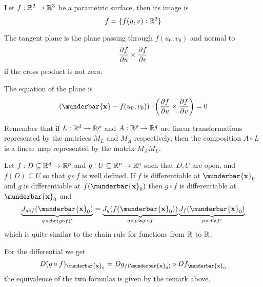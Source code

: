 \documentclass[14pt]{extarticle}
\renewcommand{\vec}[1]{\munderbar{\mathbf{#1}}}
\begin{document}
\begin{example}
    Let $f: \mathbb{R}^2 \to \mathbb{R}^3$ be a parametric surface, then its image is
    \begin{equation}
        f = \{ f(u, v) : \mathbb{R}^2 \}
    \end{equation}

    The tangent plane is the plane passing through $f(u_0, v_0)$ and normal to
    \begin{equation}
        \pdv{f}{u}() \times \pdv{f}{v}()
    \end{equation}
    if the cross product is not zero.

    The equation of the plane is
    \begin{equation}
        (\vec{x} - f(u_0, v_0)) \cdot \left( \pdv{f}{u}() \times \pdv{f}{v}() \right) = 0
    \end{equation}

\end{example}


\begin{remark}
    Remember that if $L: \mathbb{R}^d \to \mathbb{R}^p$ and $A: \mathbb{R}^p \to \mathbb{R}^q$ are linear transformations represented by the matrices $M_L$ and $M_A$ respectively, then the composition $A \circ L$ is a linear map represented by the matrix $M_A M_L$.
\end{remark}

\begin{theorem}
    Let $f: D \subseteq \mathbb{R}^d \to \mathbb{R}^p$ and $g: U \subseteq \mathbb{R}^p \to \mathbb{R}^q$ such that $D, U$ are open, and $f(D) \subseteq U$ so that $g \circ f$ is well defined.
    If $f$ is differentiable at $\vec{x}_0$ and $g$ is differentiable at $f(\vec{x}_0)$ then $g \circ f$ is differentiable at $\vec{x}_0$ and
    \begin{equation}
        \underbrace{J_{g \circ f}(\vec{x}_0)}_{q \times d \approx (g \circ f)'} =
        \underbrace{J_g(f(\vec{x}_0))}_{q \times p \approx g' \circ f}
        \underbrace{J_f(\vec{x}_0)}_{p \times d \approx f'}
    \end{equation}
    which is quite similar to the chain rule for functions from $\mathbb{R}$ to $\mathbb{R}$.

    For the differential we get
    \begin{equation}
        D(g \circ f)_{\vec{x}_0} = Dg_{f(\vec{x}_0)} \circ Df_{\vec{x}_0}
    \end{equation}
    the equivalence of the two formulas is given by the remark above.
\end{theorem}
\end{document}
